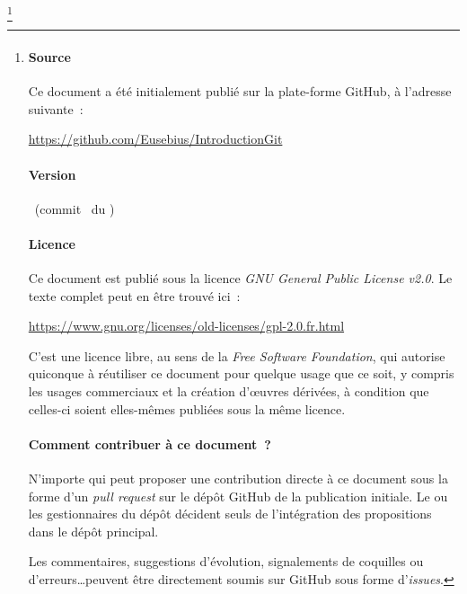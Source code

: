 \thanks{

  \par\vspace*{\fill}

  \paragraph*{Source}

  Ce document a été initialement publié sur la plate-forme GitHub, à
  l'adresse suivante~:\\
  \centerline{\url{https://github.com/Eusebius/IntroductionGit}}

  \paragraph*{Version}

  \currentVersion\
  (commit \gitAbbrevHash\ du \gitCommitterDate)
  
  \paragraph*{Licence}

  Ce document est publié sous la licence \textit{GNU General Public
    License v2.0}. Le texte complet peut en être trouvé ici~:\\
  \centerline{\url{https://www.gnu.org/licenses/old-licenses/gpl-2.0.fr.html}}

  C'est une licence libre, au sens de la \textit{Free Software
    Foundation}, qui autorise quiconque à réutiliser ce document pour
  quelque usage que ce soit, y compris les usages commerciaux et la
  création d'\oe uvres dérivées, à condition que celles-ci soient
  elles-mêmes publiées sous la même licence.

  \paragraph*{Comment contribuer à ce document~?}

  N'importe qui peut proposer une contribution directe à ce document
  sous la forme d'un \textit{pull request} sur le dépôt GitHub de la
  publication initiale. Le ou les gestionnaires du dépôt décident
  seuls de l'intégration des propositions dans le dépôt principal.

  Les commentaires, suggestions d'évolution, signalements de coquilles
  ou d'erreurs\ldots peuvent être directement soumis sur GitHub sous
  forme d'\textit{issues}.

}
